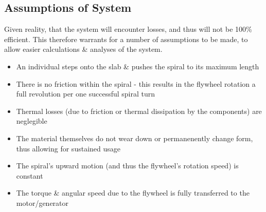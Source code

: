 \documentclass[conference]{IEEEtran}
\begin{document}


\subsection{Assumptions of System}
Given reality, that the system will encounter losses, and thus will not be 100\% efficient. This therefore warrants for a number of assumptions to be made, to allow easier calculations \& analyses of the system.
\begin{itemize}
    \item An individual steps onto the slab \& pushes the spiral to its maximum length
    \item There is no friction within the spiral - this results in the flywheel rotation a full revolution per one successful spiral turn
    \item Thermal losses (due to friction or thermal dissipation by the components) are neglegible
    \item The material themselves do not wear down or permanenently change form, thus allowing for sustained usage
    \item The spiral's upward motion (and thus the flywheel's rotation speed) is constant
    \item The torque \& angular speed due to the flywheel is fully transferred to the motor/generator
\end{itemize}
\end{document}

